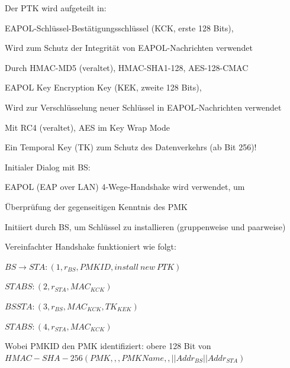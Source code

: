 \documentclass[a4paper]{article}
\begin{document}
\begin{multicols}{3}
\begin{itemize*}
\begin{itemize*}
            \end{itemize*}
            \item Der PTK wird aufgeteilt in:
            \begin{itemize*}
                  \item EAPOL-Schlüssel-Bestätigungsschlüssel (KCK, erste 128 Bits),
                  \begin{itemize*}
                        \item Wird zum Schutz der Integrität von EAPOL-Nachrichten verwendet
                        \item Durch HMAC-MD5 (veraltet), HMAC-SHA1-128, AES-128-CMAC
                  \end{itemize*}
                  \item EAPOL Key Encryption Key (KEK, zweite 128 Bits),
                  \begin{itemize*}
                        \item Wird zur Verschlüsselung neuer Schlüssel in EAPOL-Nachrichten verwendet
                        \item Mit RC4 (veraltet), AES im Key Wrap Mode
                  \end{itemize*}
                  \item Ein Temporal Key (TK) zum Schutz des Datenverkehrs (ab Bit 256)!
            \end{itemize*}
            \item Initialer Dialog mit BS:
            \begin{itemize*}
                  \item EAPOL (EAP over LAN) 4-Wege-Handshake wird verwendet, um
                  \begin{itemize*}
                        \item Überprüfung der gegenseitigen Kenntnis des PMK
                        \item Initiiert durch BS, um Schlüssel zu installieren (gruppenweise und paarweise)
                  \end{itemize*}
                  \item Vereinfachter Handshake funktioniert wie folgt:
                  \begin{enumerate*}
                        \item $BS\rightarrow STA: (1, r_{BS} , PMKID, install\ new\ PTK)$
                        \item $STA BS: (2, r_{STA}, MAC_{KCK})$
                        \item $BS STA: (3, r_{BS}, MAC_{KCK}, {TK}_{KEK})$
                        \item $STA BS: (4, r_{STA}, MAC_{KCK})$
                  \end{enumerate*}
                  \item Wobei PMKID den PMK identifiziert: obere 128 Bit von $HMAC-SHA-256(PMK, ,,PMK Name,, || Addr_{BS} || Addr_{STA} )$
            \end{itemize*}
      \end{itemize*}


\end{multicols}
\end{document}
